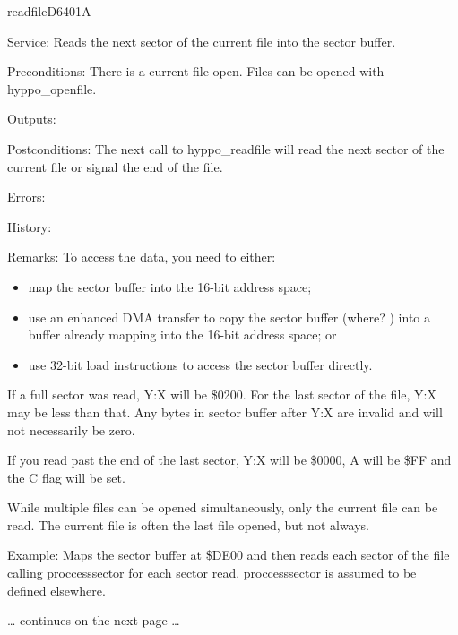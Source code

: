 \newpage
\begin{hyppotrap}{readfile}{D640}{1A}
\item [Service:]
  Reads the next sector of the current file into the sector buffer.
\item [Preconditions:]
  There is a current file open. Files can be opened with hyppo\_openfile.
\item [Outputs:]
\item [Postconditions:]
  The next call to hyppo\_readfile will read the next sector of the current file
  or signal the end of the file.
\item [Errors:]
  \TODO
\item [History:]
\item [Remarks:]
  To access the data, you need to either:
  \begin{itemize}
    \item map the sector buffer into the 16-bit address space;
    \item use an enhanced DMA transfer to copy the sector buffer (where? \TODO)
          into a buffer already mapping into the 16-bit address space; or
    \item use 32-bit load instructions to access the sector buffer directly.
  \end{itemize}

  If a full sector was read, Y:X will be \$0200. For the last sector of the
  file, Y:X may be less than that. Any bytes in sector buffer after Y:X are
  invalid and will not necessarily be zero.

  If you read past the end of the last sector, Y:X will be \$0000, A will be
  \$FF and the C flag will be set.

  While multiple files can be opened simultaneously, only the current file can
  be read. The current file is often the last file opened, but not always.
\item [Example:]
  Maps the sector buffer at \$DE00 and then reads each sector of the file calling
  proccesssector for each sector read. proccesssector is assumed to be defined
  elsewhere.

  \ldots{} continues on the next page \ldots


\end{hyppotrap}

